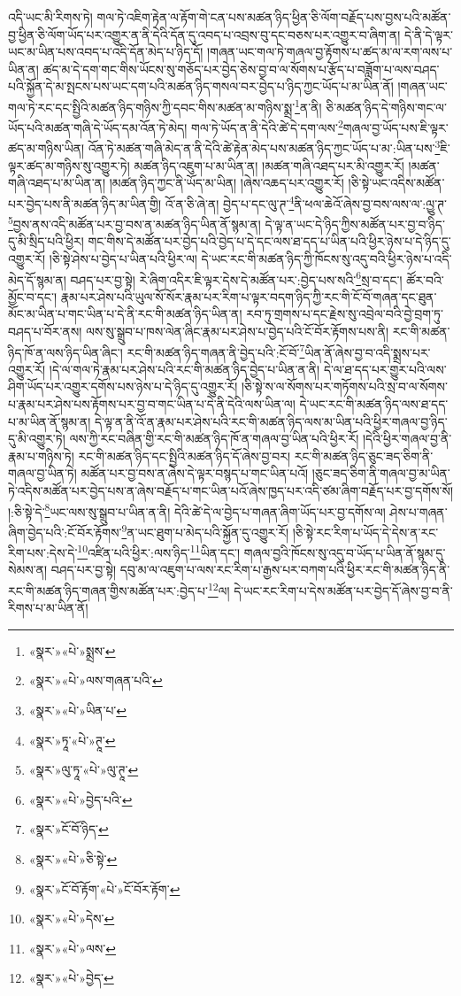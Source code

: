 འདི་ཡང་མི་རིགས་ཏེ། གལ་ཏེ་འཇིག་རྟེན་ལ་རྟོག་གེ་ངན་པས་མཚན་ཉིད་ཕྱིན་ཅི་ལོག་བརྗོད་པས་བྱས་པའི་མཚོན་བྱ་ཕྱིན་ཅི་ལོག་ཡོད་པར་འགྱུར་ན་ནི་དེའི་དོན་དུ་འབད་པ་འབྲས་བུ་དང་བཅས་པར་འགྱུར་བ་ཞིག་ན། དེ་ནི་དེ་ལྟར་ཡང་མ་ཡིན་པས་འབད་པ་འདི་དོན་མེད་པ་ཉིད་དོ། །གཞན་ཡང་གལ་ཏེ་གཞལ་བྱ་རྟོགས་པ་ཚད་མ་ལ་རག་ལས་པ་ཡིན་ན། ཚད་མ་དེ་དག་གང་གིས་ཡོངས་སུ་གཅོད་པར་བྱེད་ཅེས་བྱ་བ་ལ་སོགས་པ་རྩོད་པ་བཟློག་པ་ལས་བཤད་པའི་སྐྱོན་དེ་མ་སྤངས་པས་ཡང་དག་པའི་མཚན་ཉིད་གསལ་བར་བྱེད་པ་ཉིད་ཀྱང་ཡོད་པ་མ་ཡིན་ནོ། །གཞན་ཡང་གལ་ཏེ་རང་དང་སྤྱིའི་མཚན་ཉིད་གཉིས་ཀྱི་དབང་གིས་མཚན་མ་གཉིས་སྨྲ་\footnote{«སྣར་»«པེ་»སྨྲས་}ན་ནི། ཅི་མཚན་ཉིད་དེ་གཉིས་གང་ལ་ཡོད་པའི་མཚན་གཞི་དེ་ཡོད་དམ་འོན་ཏེ་མེད། གལ་ཏེ་ཡོད་ན་ནི་དེའི་ཚེ་དེ་དག་ལས་\footnote{«སྣར་»«པེ་»ལས་གཞན་པའི་}གཞལ་བྱ་ཡོད་པས་ཇི་ལྟར་ཚད་མ་གཉིས་ཡིན། འོན་ཏེ་མཚན་གཞི་མེད་ན་ནི་དེའི་ཚེ་རྟེན་མེད་པས་མཚན་ཉིད་ཀྱང་ཡོད་པ་མ་:ཡིན་པས་\footnote{«སྣར་»«པེ་»ཡིན་པ་}ཇི་ལྟར་ཚད་མ་གཉིས་སུ་འགྱུར་ཏེ། མཚན་ཉིད་འཇུག་པ་མ་ཡིན་ན། །མཚན་གཞི་འཐད་པར་མི་འགྱུར་རོ། །མཚན་གཞི་འཐད་པ་མ་ཡིན་ན། །མཚན་ཉིད་ཀྱང་ནི་ཡོད་མ་ཡིན། །ཞེས་འཆད་པར་འགྱུར་རོ། །ཅི་སྟེ་ཡང་འདིས་མཚོན་པར་བྱེད་པས་ནི་མཚན་ཉིད་མ་ཡིན་གྱི། འོ་ན་ཅི་ཞེ་ན། བྱེད་པ་དང་ལུ་ཊ་\footnote{«སྣར་»ཏཱ་«པེ་»ཊཱ་}ནི་ཕལ་ཆེའོ་ཞེས་བྱ་བས་ལས་ལ་:ལྱུ་ཊ་\footnote{«སྣར་»ལུ་ཏཱ་«པེ་»ལུ་ཊཱ་}བྱས་ནས་འདི་མཚོན་པར་བྱ་བས་ན་མཚན་ཉིད་ཡིན་ནོ་སྙམ་ན། དེ་ལྟ་ན་ཡང་དེ་ཉིད་ཀྱིས་མཚོན་པར་བྱ་བ་ཉིད་དུ་མི་སྲིད་པའི་ཕྱིར། གང་གིས་དེ་མཚོན་པར་བྱེད་པའི་བྱེད་པ་དེ་དང་ལས་ཐ་དད་པ་ཡིན་པའི་ཕྱིར་ཉེས་པ་དེ་ཉིད་དུ་འགྱུར་རོ། །ཅི་སྟེ་ཤེས་པ་བྱེད་པ་ཡིན་པའི་ཕྱིར་ལ། དེ་ཡང་རང་གི་མཚན་ཉིད་ཀྱི་ཁོངས་སུ་འདུ་བའི་ཕྱིར་ཉེས་པ་འདི་མེད་དོ་སྙམ་ན། བཤད་པར་བྱ་སྟེ། རེ་ཞིག་འདིར་ཇི་ལྟར་དེས་དེ་མཚོན་པར་:བྱེད་པས་སའི་\footnote{«སྣར་»«པེ་»བྱེད་པའི་}སྲ་བ་དང་། ཚོར་བའི་མྱོང་བ་དང་། རྣམ་པར་ཤེས་པའི་ཡུལ་སོ་སོར་རྣམ་པར་རིག་པ་ལྟར་བདག་ཉིད་ཀྱི་རང་གི་ངོ་བོ་གཞན་དང་ཐུན་མོང་མ་ཡིན་པ་གང་ཡིན་པ་དེ་ནི་རང་གི་མཚན་ཉིད་ཡིན་ན། རབ་ཏུ་གྲགས་པ་དང་རྗེས་སུ་འབྲེལ་བའི་བྱེ་བྲག་ཏུ་བཤད་པ་བོར་ནས། ལས་སུ་སྒྲུབ་པ་ཁས་ལེན་ཞིང་རྣམ་པར་ཤེས་པ་བྱེད་པའི་ངོ་བོར་རྟོགས་པས་ནི། རང་གི་མཚན་ཉིད་ཁོ་ན་ལས་ཉིད་ཡིན་ཞིང་། རང་གི་མཚན་ཉིད་གཞན་ནི་བྱེད་པའི་:ངོ་བོ་\footnote{«སྣར་»ངོ་བོ་ཉིད་}ཡིན་ནོ་ཞེས་བྱ་བ་འདི་སྨྲས་པར་འགྱུར་རོ། །དེ་ལ་གལ་ཏེ་རྣམ་པར་ཤེས་པའི་རང་གི་མཚན་ཉིད་བྱེད་པ་ཡིན་ན་ནི། དེ་ལ་ཐ་དད་པར་གྱུར་པའི་ལས་ཤིག་ཡོད་པར་འགྱུར་དགོས་པས་ཉེས་པ་དེ་ཉིད་དུ་འགྱུར་རོ། །ཅི་སྟེ་ས་ལ་སོགས་པར་གཏོགས་པའི་སྲ་བ་ལ་སོགས་པ་རྣམ་པར་ཤེས་པས་རྟོགས་པར་བྱ་བ་གང་ཡིན་པ་དེ་ནི་དེའི་ལས་ཡིན་ལ། དེ་ཡང་རང་གི་མཚན་ཉིད་ལས་ཐ་དད་པ་མ་ཡིན་ནོ་སྙམ་ན། དེ་ལྟ་ན་ནི་འོ་ན་རྣམ་པར་ཤེས་པའི་རང་གི་མཚན་ཉིད་ལས་མ་ཡིན་པའི་ཕྱིར་གཞལ་བྱ་ཉིད་དུ་མི་འགྱུར་ཏེ། ལས་ཀྱི་རང་བཞིན་གྱི་རང་གི་མཚན་ཉིད་ཁོ་ན་གཞལ་བྱ་ཡིན་པའི་ཕྱིར་རོ། །དེའི་ཕྱིར་གཞལ་བྱ་ནི་རྣམ་པ་གཉིས་ཏེ། རང་གི་མཚན་ཉིད་དང་སྤྱིའི་མཚན་ཉིད་དོ་ཞེས་བྱ་བར། རང་གི་མཚན་ཉིད་ཅུང་ཟད་ཅིག་ནི་གཞལ་བྱ་ཡིན་ཏེ། མཚོན་པར་བྱ་བས་ན་ཞེས་དེ་ལྟར་བསྙད་པ་གང་ཡིན་པའོ། །ཅུང་ཟད་ཅིག་ནི་གཞལ་བྱ་མ་ཡིན་ཏེ་འདིས་མཚོན་པར་བྱེད་པས་ན་ཞེས་བརྗོད་པ་གང་ཡིན་པའོ་ཞེས་ཁྱད་པར་འདི་ཙམ་ཞིག་བརྗོད་པར་བྱ་དགོས་སོ། །:ཅི་སྟེ་དེ་\footnote{«སྣར་»«པེ་»ཅི་སྟེ་}ཡང་ལས་སུ་སྒྲུབ་པ་ཡིན་ན་ནི། དེའི་ཚེ་དེ་ལ་བྱེད་པ་གཞན་ཞིག་ཡོད་པར་བྱ་དགོས་ལ། ཤེས་པ་གཞན་ཞིག་བྱེད་པའི་:ངོ་བོར་རྟོགས་\footnote{«སྣར་»ངོ་བོ་རྟོག་«པེ་»ངོ་བོར་རྟོག་}ན་ཡང་ཐུག་པ་མེད་པའི་སྐྱོན་དུ་འགྱུར་རོ། །ཅི་སྟེ་རང་རིག་པ་ཡོད་དེ་དེས་ན་རང་རིག་པས་:དེས་དེ་\footnote{«སྣར་»«པེ་»དེས་}འཛིན་པའི་ཕྱིར་:ལས་ཉིད་\footnote{«སྣར་»«པེ་»ལས་}ཡིན་དང་། གཞལ་བྱའི་ཁོངས་སུ་འདུ་བ་ཡོད་པ་ཡིན་ནོ་སྙམ་དུ་སེམས་ན། བཤད་པར་བྱ་སྟེ། དབུ་མ་ལ་འཇུག་པ་ལས་རང་རིག་པ་རྒྱས་པར་བཀག་པའི་ཕྱིར་རང་གི་མཚན་ཉིད་ནི་རང་གི་མཚན་ཉིད་གཞན་གྱིས་མཚོན་པར་:བྱེད་པ་\footnote{«སྣར་»«པེ་»བྱེད་}ལ། དེ་ཡང་རང་རིག་པ་དེས་མཚོན་པར་བྱེད་དོ་ཞེས་བྱ་བ་ནི་རིགས་པ་མ་ཡིན་ནོ། 